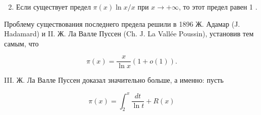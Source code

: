 \documentclass[10pt]{article}
\begin{document}
\begin{enumerate}

  \setcounter{enumi}{1}

  \item Если существует предел $\pi(x) \ln x / x$ при $x \rightarrow+\infty$, то этот предел равен 1 .

\end{enumerate}



Проблему существования последнего предела решили в 1896 Ж. Адамар (J. Hadamard) и II. Ж. Ла Валле Пуссен (Ch. J. La Vallée Poussin), установив тем самым, что



\[

\pi(x)=\frac{x}{\ln x}(1+o(1)) .

\]



III. Ж. Ла Валле Пуссен доказал значительно больше, а именно: пусть



\[

\pi(x)=\int_{2}^{x} \frac{d t}{\ln t}+R(x)

\]
\end{document}
